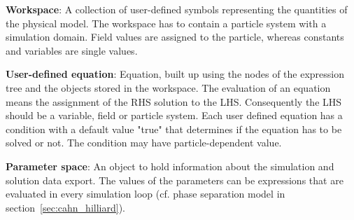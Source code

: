 \documentclass[a4paper,12pt,openany]{book}
\theoremstyle{break}
\begin{document}
\textbf{Workspace}: A collection of user-defined symbols representing the quantities of the physical model. The workspace has to contain a particle system with a simulation domain. Field values are assigned to the particle, whereas constants and variables are single values.

\textbf{User-defined equation}: Equation, built up using the nodes of the expression tree and the objects stored in the workspace. The evaluation of an equation means the assignment of the RHS solution to the LHS. Consequently the LHS should be a variable, field or particle system. Each user defined equation has a condition with a default value "true" that determines if the equation has to be solved or not. The condition may have particle-dependent value.

\textbf{Parameter space}: An object to hold information about the simulation and solution data export. The values of the parameters can be expressions that are evaluated in every simulation loop (cf. phase separation model in section \ref{sec:cahn_hilliard}).
\end{document}
